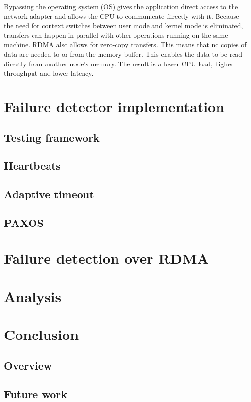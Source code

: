 \documentclass[bsc,frontabs,twoside,singlespacing,parskip,deptreport,hidel]{infthesis}     %
\begin{document}
Bypassing the operating system (OS) gives the application direct access to the network adapter and allows the CPU to communicate directly with it. Because the need for context switches between user mode and kernel mode is eliminated, transfers can happen in parallel with other operations running on the same machine. RDMA also allows for zero-copy transfers. This means that no copies of data are needed to or from the memory buffer. This enables the data to be read directly from another node's memory. The result is a lower CPU load, higher throughput and lower latency.


\chapter{Failure detector implementation}
\label{chap:failure_detector_impl}

\section{Testing framework}
\section{Heartbeats}
\section{Adaptive timeout}
\section{PAXOS}

\chapter{Failure detection over RDMA}
\label{chap:rdma_impl}

\chapter{Analysis}
\label{chap:analysis}

\chapter{Conclusion}
\label{chap:conclusion}
\section{Overview}
\section{Future work}




\end{document}
